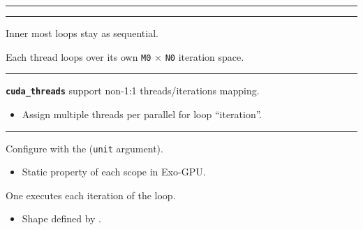 \newpage
{}

{\large

}

\vspace{3mm}
\hrule

\begin{center}
\end{center}

\newpage
{}

{\large

}

\vspace{3mm}
\hrule

{\LARGE
Inner most loops stay as sequential.

Each thread loops over its own \texttt{M0} $\times$ \texttt{N0} iteration space.

}

\newpage
{}

{\large

}

\vspace{3mm}
\hrule

{\LARGE
\texttt{\textbf{cuda\_threads}} support non-1:1 threads/iterations mapping.
\begin{itemize}
  \item Assign multiple threads per parallel for loop ``iteration''.
\end{itemize}

}

\newpage
{}

{\large

}

\vspace{3mm}
\hrule

{\LARGE

Configure with the  (\texttt{unit} argument).
\begin{itemize}
  \item Static property of each scope in Exo-GPU.
\end{itemize}

One  executes each iteration of the loop.
\begin{itemize}
  \item Shape defined by .
\end{itemize}

}

